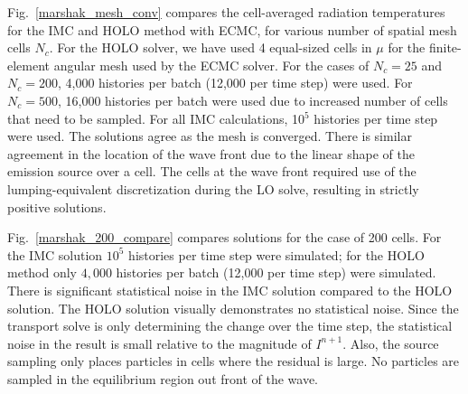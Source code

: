 \documentclass{mc2013}
\begin{document}
Fig.~\ref{marshak_mesh_conv} compares the cell-averaged radiation temperatures  for the
IMC and HOLO method with ECMC, for various number of spatial mesh cells $N_c$.  For the HOLO solver, we have used
4 equal-sized cells in $\mu$ for the finite-element angular mesh used by the ECMC solver. For the cases
of $N_c=25$ and $N_c=200$, 4,000 histories per batch (12,000 per time step)  were used.  For $N_c=500$, 16,000 histories per batch were used due to increased number of cells that
need to be sampled.  For all IMC calculations, 10$^5$ histories per time step were used. The solutions agree as the mesh is converged.  There is
similar agreement in the location of the wave front due to the linear shape of the emission source over a cell.  The cells
at the wave front required use of the lumping-equivalent discretization during the LO
solve, resulting in strictly positive solutions.


Fig.~\ref{marshak_200_compare} compares solutions
for the case of 200 cells.  For the IMC solution $10^5$ histories per time step were
simulated; for the HOLO method only $4,000$ histories per batch
(12,000 per time step) were simulated. There is significant statistical noise in the IMC solution
compared to the HOLO solution.  The HOLO solution visually demonstrates no statistical noise.  Since the transport solve is only determining the change over the
time step, the statistical noise in the result is small relative to the magnitude of
$I^{n+1}$.  Also, the source sampling only places particles in cells where the residual is
large.  No particles are sampled in the equilibrium region out front of the wave. 


\end{document}
